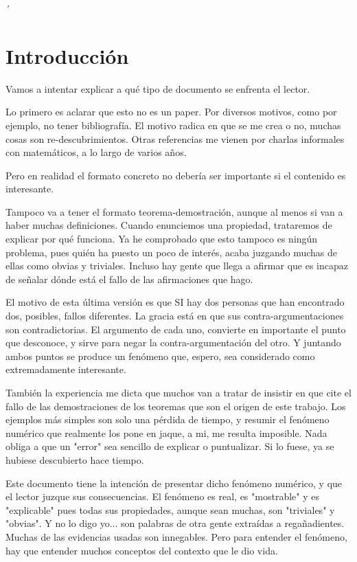´\chapter{Introducción}

Vamos a intentar explicar a qué tipo de documento se enfrenta el lector.

Lo primero es aclarar que esto no es un paper. Por diversos motivos, como por ejemplo, no tener bibliografía. El motivo radica en que se me crea o no, muchas cosas son re-descubrimientos. Otras referencias me vienen por charlas informales con matemáticos, a lo largo de varios años.

Pero en realidad el formato concreto no debería ser importante si el contenido es interesante.

Tampoco va a tener el formato teorema-demostración, aunque al menos si van a haber muchas definiciones. Cuando enunciemos una propiedad, trataremos de explicar por qué funciona. Ya he comprobado que esto tampoco es ningún problema, pues quién ha puesto un poco de interés, acaba juzgando muchas de ellas como obvias y triviales. Incluso hay gente que llega a afirmar que es incapaz de señalar dónde está el fallo de las afirmaciones que hago.

El motivo de esta última versión es que SI hay dos personas que han encontrado dos, posibles, fallos diferentes. La gracia está en que sus contra-argumentaciones son contradictorias. El argumento de cada uno, convierte en importante el punto que desconoce, y sirve para negar la contra-argumentación del otro. Y juntando ambos puntos se produce un fenómeno que, espero, sea considerado como extremadamente interesante.

También la experiencia me dicta que muchos van a tratar de insistir en que cite el fallo de las demostraciones de los teoremas que son el origen de este trabajo. Los ejemplos más simples son solo una pérdida de tiempo, y resumir el fenómeno numérico que realmente los pone en jaque, a mi, me resulta imposible. Nada obliga a que un "error" sea sencillo de explicar o puntualizar. Si lo fuese, ya se hubiese descubierto hace tiempo.

Este documento tiene la intención de presentar dicho fenómeno numérico, y que el lector juzque sus consecuencias. El fenómeno es real, es "mostrable" y es "explicable" pues todas sus propiedades, aunque sean muchas, son "triviales" y "obvias". Y no lo digo yo... son palabras de otra gente extraídas a regañadientes. Muchas de las evidencias usadas son innegables. Pero para entender el fenómeno, hay que entender muchos conceptos del contexto que le dio vida.

